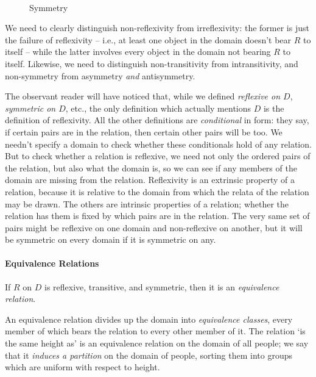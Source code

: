 \begin{figure}
\begin{center}
  ~{\qquad\qquad}{}
\end{center}  \caption{Symmetry\label{ftwo}}
\end{figure}
We need to clearly distinguish non-reflexivity from irreflexivity: the former is just the failure of reflexivity – i.e., at least one object in the domain doesn't bear $R$ to itself – while the latter involves every object in the domain not bearing $R$ to itself. Likewise, we need to distinguish non-transitivity from intransitivity, and non-symmetry from asymmetry \emph{and} antisymmetry. 

The observant reader will have noticed that, while we defined \emph{reflexive on $D$}, \emph{symmetric on $D$}, etc., the only definition which actually mentions $D$ is the definition of reflexivity. All the other definitions are \emph{conditional} in form: they say, if certain pairs are in the relation, then certain other pairs will be too. We needn't specify a domain to check whether these conditionals hold of any relation. But to check whether a relation is reflexive, we need not only the ordered pairs of the relation, but also what the domain is, so we can see if any members of the domain are missing from the relation. Reflexivity is an extrinsic property of a relation, because it is relative to the domain from which the relata of the relation may be drawn. The others are intrinsic properties of a relation; whether the relation has them is fixed by which pairs are in the relation. The very same set of pairs might be reflexive on one domain and non-reflexive on another, but it will be symmetric on every domain if it is symmetric on any.

\paragraph{Equivalence Relations}
\begin{definition}
  If $R$ on $D$ is reflexive, transitive, and symmetric, then it is an \emph{equivalence relation}. 
\end{definition}
An equivalence relation divides up the domain into \emph{equivalence classes}, every member of which bears the relation to every other member of it. The relation `is the same height as' is an equivalence relation on the domain of all people; we say that it \emph{induces a partition} on the domain of people, sorting them into groups which are uniform with respect to height.

